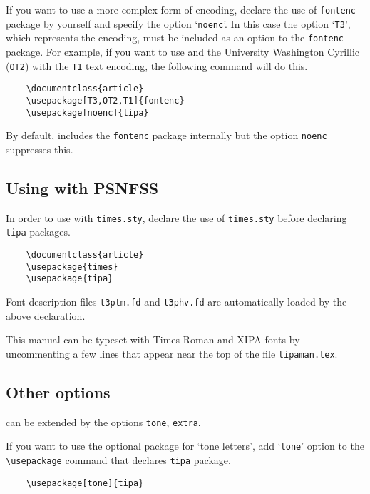 If you want to use a more complex form of encoding, declare the use of
\texttt{fontenc} package by yourself and specify the option
`\texttt{noenc}'. In this case the option `\texttt{T3}', which represents
the \tipa{} encoding, must be included as an option to the
\texttt{fontenc} package. For example, if you want to use \tipa{} and
the University Washington Cyrillic (\texttt{OT2}) with the \texttt{T1}
text encoding, the following command will do this.

\begin{verbatim}
    \documentclass{article}
    \usepackage[T3,OT2,T1]{fontenc}
    \usepackage[noenc]{tipa}
\end{verbatim}

By default, \tipa{} includes the \texttt{fontenc} package internally but 
the option \texttt{noenc} suppresses this.

\subsection{Using \tipa{} with PSNFSS}

In order to use \tipa{} with \texttt{times.sty}, declare the use of
\texttt{times.sty} before declaring \texttt{tipa} packages.

\begin{verbatim}
    \documentclass{article}
    \usepackage{times}
    \usepackage{tipa}
\end{verbatim}

Font description files \texttt{t3ptm.fd} and \texttt{t3phv.fd} 
are automatically loaded by the above declaration.

This manual can be typeset with Times Roman and \textsf{XIPA} fonts by
uncommenting a few lines that appear near the top of the file
\texttt{tipaman.tex}.

\subsection{Other options}\label{sec:otheroptions}

\tipa{} can be extended by the options \texttt{tone}, \texttt{extra}.

If you want to use the optional package for `tone letters', add
`\texttt{tone}' option to the \verb|\usepackage| command that declares
\texttt{tipa} package.

\begin{verbatim}
    \usepackage[tone]{tipa}
\end{verbatim}

